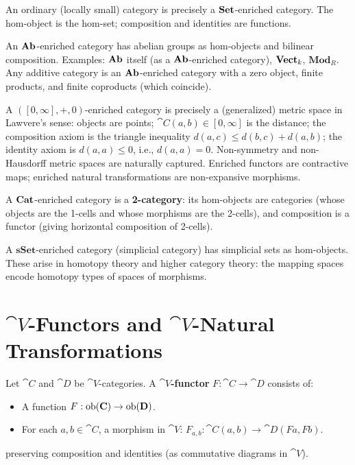 \begin{remark}
An ordinary (locally small) category is precisely a $\mathbf{Set}$-enriched category. The hom-object is the hom-set; composition and identities are functions.
\end{remark}

\begin{example}
An $\mathbf{Ab}$-enriched category has abelian groups as hom-objects and bilinear composition. Examples: $\mathbf{Ab}$ itself (as a $\mathbf{Ab}$-enriched category), $\mathbf{Vect}_k$, $\mathbf{Mod}_R$. Any additive category is an $\mathbf{Ab}$-enriched category with a zero object, finite products, and finite coproducts (which coincide).
\end{example}

\begin{example}
A $([0,\infty], +, 0)$-enriched category is precisely a (generalized) metric space in Lawvere's sense: objects are points; $\cat{C}(a,b) \in [0,\infty]$ is the distance; the composition axiom is the triangle inequality $d(a,c) \leq d(b,c) + d(a,b)$; the identity axiom is $d(a,a) \leq 0$, i.e., $d(a,a) = 0$. Non-symmetry and non-Hausdorff metric spaces are naturally captured. Enriched functors are contractive maps; enriched natural transformations are non-expansive morphisms.
\end{example}

\begin{example}
A $\mathbf{Cat}$-enriched category is a \textbf{2-category}: its hom-objects are categories (whose objects are the 1-cells and whose morphisms are the 2-cells), and composition is a functor (giving horizontal composition of 2-cells).
\end{example}

\begin{example}
A $\mathbf{sSet}$-enriched category (simplicial category) has simplicial sets as hom-objects. These arise in homotopy theory and higher category theory: the mapping spaces encode homotopy types of spaces of morphisms.
\end{example}

\section{$\cat{V}$-Functors and $\cat{V}$-Natural Transformations}

\begin{definition}
Let $\cat{C}$ and $\cat{D}$ be $\cat{V}$-categories. A \textbf{$\cat{V}$-functor} $F: \cat{C} \to \cat{D}$ consists of:
\begin{itemize}
  \item A function $F: \operatorname{ob}(\mathbf{C}) \to \operatorname{ob}(\mathbf{D})$.
  \item For each $a, b \in \cat{C}$, a morphism in $\cat{V}$: $F_{a,b}: \cat{C}(a,b) \to \cat{D}(Fa,Fb)$.
\end{itemize}
preserving composition and identities (as commutative diagrams in $\cat{V}$).
\end{definition}

